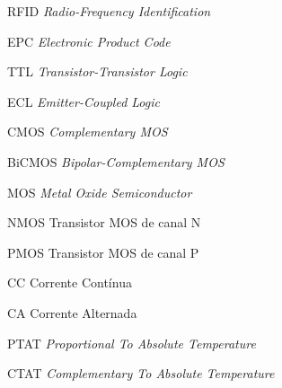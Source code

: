 \clearpage
\renewcommand{\listadesiglasname}{Lista de siglas e abreviaturas}
\begin{siglas}
	\item[RFID] \textit{Radio-Frequency Identification}
	\item[EPC] \textit{Electronic Product Code}
	\item[TTL] \textit{Transistor-Transistor Logic}
	\item[ECL] \textit{Emitter-Coupled Logic}
	\item[CMOS] \textit{Complementary MOS}
	\item[BiCMOS] \textit{Bipolar-Complementary MOS}
	\item[MOS] \textit{Metal Oxide Semiconductor}
	\item[NMOS] Transistor MOS de canal N
	\item[PMOS] Transistor MOS de canal P
	\item[CC] Corrente Contínua
	\item[CA] Corrente Alternada
	\item[PTAT] \textit{Proportional To Absolute Temperature}
	\item[CTAT] \textit{Complementary To Absolute Temperature}
\end{siglas}

\clearpage
{} %
\tableofcontents*

\label{LastPreContentPage}

\clearpage